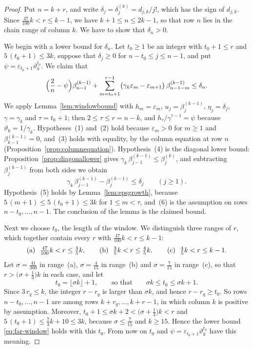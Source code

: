 \documentclass{amsart}
\theoremstyle{definition}
\theoremstyle{remark}
\numberwithin{equation}{section}
\begin{document}
\begin{proof}
Put $n=k+r$, and write $\delta_j=\delta^{(k)}_j=d_{j,k}/j!$, which has the sign of $d_{j,k}$. Since $\frac{47}{100}k<r\le k-1$, we have $k+1\le n\le 2k-1$, so that row $n$ lies in the chain range of column $k$. We have to show that $\delta_n>0$.

We begin with a lower bound for $\delta_n$. Let $t_0\ge 1$ be an integer with $t_0+1\le r$ and $5\,(t_0+1)\le 3k$, suppose that $\delta_j\ge 0$ for $n-t_0\le j\le n-1$, and put $\psi=\varepsilon_{t_0+1}\vartheta_k^{t_0}$. We claim that
\begin{equation}\label{eq:far-window}
\Bigl(\frac2n-\psi\Bigr)\beta^{(k-1)}_{n-1}+\sum_{m=t_0+1}^{r-1}\bigl(\gamma_k\varepsilon_m-\varepsilon_{m+1}\bigr)\,\beta^{(k-1)}_{n-1-m}\le\delta_n .
\end{equation}
We apply Lemma~\ref{lem:windowbound} with $h_m=\varepsilon_m$, $u_j=\beta^{(k-1)}_j$, $\eta_j=\delta_j$, $\gamma=\gamma_k$ and $\tau=t_0+1$; then $2\le\tau\le r=n-k$, and $h_\tau/\gamma^{\tau-1}=\psi$ because $\vartheta_k=1/\gamma_k$. Hypotheses~(1) and~(2) hold because $\varepsilon_m>0$ for $m\ge 1$ and $\beta^{(k-1)}_{k-1}=0$, and~(3) holds with equality, by the column equation at row $n$ (Proposition~\ref{prop:columnequation}). Hypothesis~(4) is the diagonal lower bound: Proposition~\ref{prop:diagonallower} gives $\gamma_k\,\beta^{(k-1)}_{j-1}\le\beta^{(k)}_j$, and subtracting $\beta^{(k-1)}_j$ from both sides we obtain
\[
\gamma_k\,\beta^{(k-1)}_{j-1}-\beta^{(k-1)}_{j}\le\delta_j\qquad(j\ge 1).
\]
Hypothesis~(5) holds by Lemma~\ref{lem:epsgrowth}, because $5\,(m+1)\le 5\,(t_0+1)\le 3k$ for $1\le m<\tau$, and~(6) is the assumption on rows $n-t_0,\dots,n-1$. The conclusion of the lemma is the claimed bound.

Next we choose $t_0$, the length of the window. We distinguish three ranges of $r$, which together contain every $r$ with $\frac{47}{100}k<r\le k-1$:
\[
\textup{(a)}\ \ \tfrac{47}{100}k<r\le\tfrac35k,\qquad\textup{(b)}\ \ \tfrac35k<r\le\tfrac45k,\qquad\textup{(c)}\ \ \tfrac45k<r\le k-1 .
\]
Let $\sigma=\frac{41}{300}$ in range~(a), $\sigma=\frac{4}{15}$ in range~(b) and $\sigma=\frac{7}{15}$ in range~(c), so that $r>\bigl(\sigma+\frac13\bigr)k$ in each case, and let
\[
t_0=\lfloor\sigma k\rfloor+1,\qquad\text{so that}\qquad\sigma k\le t_0\le\sigma k+1 .
\]
Since $3\,r_q\le k$, the integer $r-r_q$ is larger than $\sigma k$, and hence $r-r_q\ge t_0$. So rows $n-t_0,\dots,n-1$ are among rows $k+r_q,\dots,k+r-1$, in which column $k$ is positive by assumption. Moreover, $t_0+1\le\sigma k+2<\bigl(\sigma+\frac13\bigr)k<r$ and $5\,(t_0+1)\le\frac73k+10\le 3k$, because $\sigma\le\frac{7}{15}$ and $k\ge 15$. Hence the lower bound \eqref{eq:far-window} holds with this $t_0$. From now on $t_0$ and $\psi=\varepsilon_{t_0+1}\vartheta_k^{t_0}$ have this meaning.


\end{proof}
\end{document}
